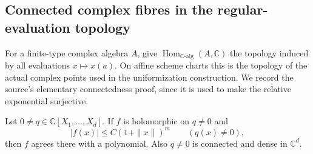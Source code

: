 \subsection{Connected complex fibres in the regular-evaluation topology}
\label{subsec:ftb-connected-complex-fibres}

For a finite-type complex algebra \(A\), give
\(\operatorname{Hom}_{\mathbb C\text{-alg}}(A,\mathbb C)\)
the topology induced by all evaluations \(x\mapsto x(a)\).
On affine scheme charts this is the topology of the actual
complex points used in the uniformization construction.
We record the source's elementary connectedness proof, since it
is used to make the relative exponential surjective.

\begin{srlemma}
\label{lem:ftb-polynomial-growth-off-hypersurface}
Let \(0\ne q\in\mathbb C[X_1,\ldots,X_d]\).
If \(f\) is holomorphic on \(q\ne0\) and
\[
                 |f(x)|\le C(1+\|x\|)^m \qquad(q(x)\ne0),
                                                               \tag{CC1}
\]
then \(f\) agrees there with a polynomial.
Also \(q\ne0\) is connected and dense in \(\mathbb C^d\).
\end{srlemma}
